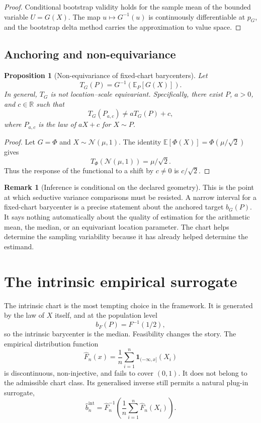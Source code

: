 \documentclass[11pt,a4paper]{article}
\newtheorem{proposition}[theorem]{Proposition}
\theoremstyle{definition}
\newtheorem{remark}[theorem]{Remark}
\newcommand{\E}{\mathbb{E}}
\newcommand{\R}{\mathbb{R}}
\begin{document}
\begin{proof}
Conditional bootstrap validity holds for the sample mean of the bounded variable $U=G(X)$. The map $u\mapsto G^{-1}(u)$ is continuously differentiable at $p_G$, and the bootstrap delta method carries the approximation to value space.
\end{proof}

\subsection{Anchoring and non-equivariance}

\begin{proposition}[Non-equivariance of fixed-chart barycenters]\label{prop:nonequivariance}
Let
\[
T_G(P)=G^{-1}(\E_P[G(X)]).
\]
In general, $T_G$ is not location--scale equivariant. Specifically, there exist $P$, $a>0$, and $c\in\R$ such that
\[
T_G(P_{a,c})\neq aT_G(P)+c,
\]
where $P_{a,c}$ is the law of $aX+c$ for $X\sim P$.
\end{proposition}

\begin{proof}
Let $G=\Phi$ and $X\sim\mathcal N(\mu,1)$. The identity $\E[\Phi(X)]=\Phi(\mu/\sqrt2)$ gives
\[
T_\Phi(\mathcal N(\mu,1))=\mu/\sqrt2.
\]
Thus the response of the functional to a shift by $c\neq0$ is $c/\sqrt2$.
\end{proof}

\begin{remark}[Inference is conditional on the declared geometry]
This is the point at which seductive variance comparisons must be resisted. A narrow interval for a fixed-chart barycenter is a precise statement about the anchored target $b_G(P)$. It says nothing automatically about the quality of estimation for the arithmetic mean, the median, or an equivariant location parameter. The chart helps determine the sampling variability because it has already helped determine the estimand.
\end{remark}

\section{The intrinsic empirical surrogate}\label{sec:intrinsic}

The intrinsic chart is the most tempting choice in the framework. It is generated by the law of $X$ itself, and at the population level
\[
b_F(P)=F^{-1}(1/2),
\]
so the intrinsic barycenter is the median. Feasibility changes the story. The empirical distribution function
\[
\widehat F_n(x)=\frac1n\sum_{i=1}^n\mathbf 1_{(-\infty,x]}(X_i)
\]
is discontinuous, non-injective, and fails to cover $(0,1)$. It does not belong to the admissible chart class. Its generalised inverse still permits a natural plug-in surrogate,
\[
\widehat b_n^{\mathrm{int}}
=
\widehat F_n^{-1}\!\left(
\frac1n\sum_{i=1}^n\widehat F_n(X_i)
\right).
\]
\end{document}
